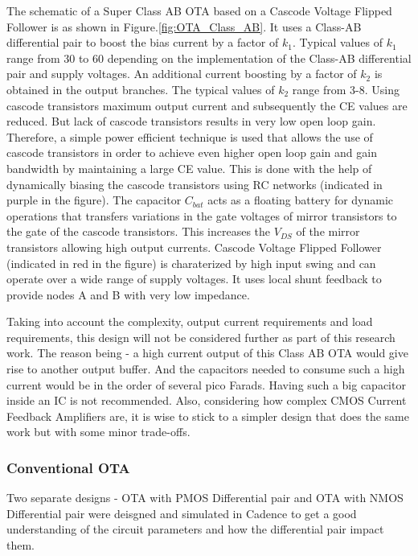 The schematic of a Super Class AB OTA based on a Cascode Voltage Flipped Follower is as shown in Figure.\ref{fig:OTA_Class_AB}. It uses a Class-AB differential pair to boost the bias current by a factor of $k_1$. Typical values of $k_1$ range from 30 to 60 depending on the implementation of the Class-AB differential pair and supply voltages. An additional current boosting by a factor of $k_2$ is obtained in the output branches. The typical values of $k_2$ range from 3-8. Using cascode transistors maximum output current and subsequently the CE values are reduced. But lack of cascode transistors results in very low open loop gain. Therefore, a simple power efficient technique is used that allows the use of cascode transistors in order to achieve even higher open loop gain and gain bandwidth by maintaining a large CE value. This is done with the help of dynamically biasing the cascode transistors using RC networks (indicated in purple in the figure). The capacitor $C_{bat}$ acts as a floating battery for dynamic operations that transfers variations in the gate voltages of mirror transistors to the gate of the cascode transistors. This increases the $V_{DS}$ of the mirror transistors allowing high output currents. Cascode Voltage Flipped Follower (indicated in red in the figure) is charaterized by high input swing and can operate over a wide range of supply voltages. It uses local shunt feedback to provide nodes A and B with very low impedance.

Taking into account the complexity, output current requirements and load requirements, this design will not be considered further as part of this research work. The reason being - a high current output of this Class AB OTA would give rise to another output buffer. And the capacitors needed to consume such a high current would be in the order of several pico Farads. Having such a big capacitor inside an IC is not recommended. Also, considering how complex CMOS Current Feedback Amplifiers are, it is wise to stick to a simpler design that does the same work but with some minor trade-offs.

\subsubsection{Conventional OTA}
Two separate designs - OTA with PMOS Differential pair and OTA with NMOS Differential pair were deisgned and simulated in Cadence to get a good understanding of the circuit parameters and how the differential pair impact them. 

